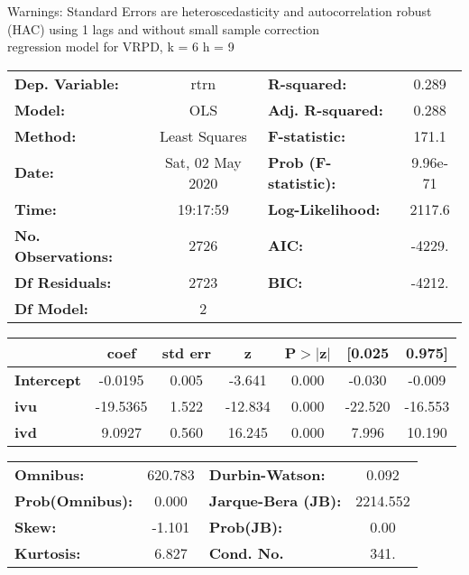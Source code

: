 Warnings: \newline
 [1] Standard Errors are heteroscedasticity and autocorrelation robust (HAC) using 1 lags and without small sample correction\\ 

regression model for VRPD, k = 6 h = 9\begin{center}
\begin{tabular}{lclc}
\toprule
\textbf{Dep. Variable:}    &       rtrn       & \textbf{  R-squared:         } &     0.289   \\
\textbf{Model:}            &       OLS        & \textbf{  Adj. R-squared:    } &     0.288   \\
\textbf{Method:}           &  Least Squares   & \textbf{  F-statistic:       } &     171.1   \\
\textbf{Date:}             & Sat, 02 May 2020 & \textbf{  Prob (F-statistic):} &  9.96e-71   \\
\textbf{Time:}             &     19:17:59     & \textbf{  Log-Likelihood:    } &    2117.6   \\
\textbf{No. Observations:} &        2726      & \textbf{  AIC:               } &    -4229.   \\
\textbf{Df Residuals:}     &        2723      & \textbf{  BIC:               } &    -4212.   \\
\textbf{Df Model:}         &           2      & \textbf{                     } &             \\
\bottomrule
\end{tabular}
\begin{tabular}{lcccccc}
                   & \textbf{coef} & \textbf{std err} & \textbf{z} & \textbf{P$> |$z$|$} & \textbf{[0.025} & \textbf{0.975]}  \\
\midrule
\textbf{Intercept} &      -0.0195  &        0.005     &    -3.641  &         0.000        &       -0.030    &       -0.009     \\
\textbf{ivu}       &     -19.5365  &        1.522     &   -12.834  &         0.000        &      -22.520    &      -16.553     \\
\textbf{ivd}       &       9.0927  &        0.560     &    16.245  &         0.000        &        7.996    &       10.190     \\
\bottomrule
\end{tabular}
\begin{tabular}{lclc}
\textbf{Omnibus:}       & 620.783 & \textbf{  Durbin-Watson:     } &    0.092  \\
\textbf{Prob(Omnibus):} &   0.000 & \textbf{  Jarque-Bera (JB):  } & 2214.552  \\
\textbf{Skew:}          &  -1.101 & \textbf{  Prob(JB):          } &     0.00  \\
\textbf{Kurtosis:}      &   6.827 & \textbf{  Cond. No.          } &     341.  \\
\bottomrule
\end{tabular}
\end{center}

